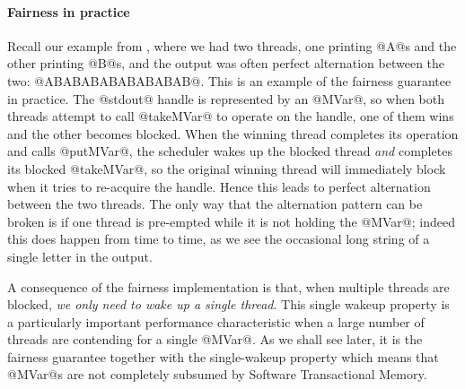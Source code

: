 \paragraph{Fairness in practice}  Recall our example from , where we had two threads,
one printing @A@s and the other printing @B@s, and the output was
often perfect alternation between the two: @ABABABABABABABAB@.  This
is an example of the fairness guarantee in practice.  The @stdout@
handle is represented by an @MVar@, so when both threads attempt to
call @takeMVar@ to operate on the handle, one of them wins and the
other becomes blocked.  When the winning thread completes its
operation and calls @putMVar@, the scheduler wakes up the blocked
thread \emph{and} completes its blocked @takeMVar@, so the original
winning thread will immediately block when it tries to re-acquire the
handle.  Hence this leads to perfect alternation between the two
threads.  The only way that the alternation pattern can be broken is if one
thread is pre-empted while it is not holding the @MVar@; indeed this
does happen from time to time, as we see the occasional long string of
a single letter in the output.


A consequence of the fairness implementation is that, when multiple
threads are blocked, \emph{we only need to wake up a single thread}.
This single wakeup property is a particularly important performance
characteristic when a large number of threads are contending for a
single @MVar@.  As we shall see later, it is the fairness guarantee
together with the single-wakeup property which means that @MVar@s are
not completely subsumed by Software Transactional Memory.

